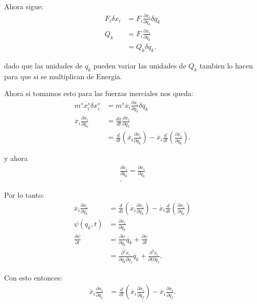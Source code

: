 \documentclass{report}
\begin{document}
    Ahora sigue:
    \begin{align*}
      F_{i}\delta x_{i} &= F_{i} \frac{\partial x_{i}}{\partial q_{k}} \delta q_{k}\\
      Q_{k}  &= F_{i}\frac{\partial x_{i}}{\partial q_{k}}  \\
      &= Q_{k}\delta q_k
    .\end{align*}

    dado que las unidades de $q_{k}$ pueden variar las unidades de $Q_{k}$ tambien lo hacen para que si se multiplican de Energia.

    Ahora si tomamos esto para las fuerzas inerciales nos queda:
    \begin{align*}
      m^{s}\ddot{x_{i}^{s}}\delta x_{i}^{s} &= m^{s}\ddot{x_{i}}\frac{\partial x_{i}}{\partial q_{k}} \delta q_{k} \\
      \ddot{x_{i}} \frac{\partial x_{i}}{\partial q_{k}} &= \frac{d\dot{x}}{dt}\frac{\partial x_{i}}{\partial q_{k}}  \\
							 &= \frac{d}{d t}\left( \dot{x_{i}}\frac{\partial x_{i}}{\partial q_{k}}  \right) - \dot{x_{i}} \frac{d}{dt}\left( \frac{\partial x_{i}}{\partial q_{k}}  \right) 
    .\end{align*}

    y ahora
    \begin{align*}
      \frac{\partial \dot{x_{i}}}{\partial \dot{q_{k}}} = \frac{\partial x_{i}}{\partial q_{k}} \\
    .\end{align*}

    Por lo tanto:
    \begin{align*}
      \ddot{x_{i}}\frac{\partial x_{i}}{\partial q_{k}} &= \frac{d}{d t}\left( \dot{x_{i}} \frac{\partial \dot{x_{i}}}{\partial q_k}  \right) - \dot{x_{i}} \frac{d}{dt}\left( \frac{\partial x_{i}}{\partial q_{k}}  \right) \\
      \psi\left( q_{k}, t \right) &= \frac{\partial x_{i}}{\partial q_{k}}  \\
      \frac{\partial \psi}{\partial t} &= \frac{\partial \psi}{\partial q_{k}} \dot{q_{k}}  +  \frac{\partial \psi}{\partial t} \\
				       &= \frac{\partial^2 x_{i}}{\partial q_{k}\partial q_{j}} \dot{q_{k}} + \frac{\partial^2 x_{i}}{\partial t \partial q_{j}}
    .\end{align*}

    Con esto entonces:
    \begin{align*}
      \ddot{x_{i}}\frac{\partial x_{i}}{\partial q_{j}} &= \frac{d}{dt}\left( \dot{x_{i}}\frac{\partial \dot{x_{i}}}{\partial q_{j}}  \right) - \dot{x_{i}}\frac{\partial \dot{x_{i}}}{\partial q_{j}}
    .\end{align*}
\end{document}
